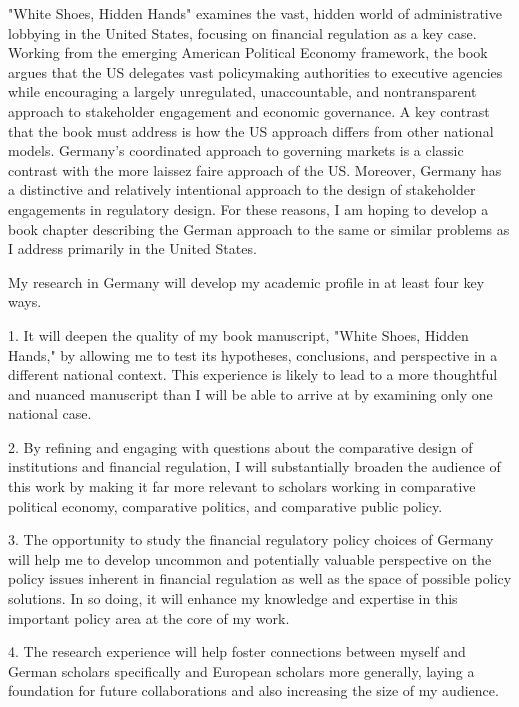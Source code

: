 "White Shoes, Hidden Hands" examines the vast, hidden world of administrative lobbying in the United States, focusing on financial regulation as a key case. Working from the emerging American Political Economy framework, the book argues that the US delegates vast policymaking authorities to executive agencies while encouraging a largely unregulated, unaccountable, and nontransparent approach to stakeholder engagement and economic governance. A key contrast that the book must address is how the US approach differs from other national models. Germany's coordinated approach to governing markets is a classic contrast with the more laissez faire approach of the US. Moreover, Germany has a distinctive and relatively intentional approach to the design of stakeholder engagements in regulatory design. For these reasons, I am hoping to develop a book chapter describing the German approach to the same or similar problems as I address primarily in the United States. 



My research in Germany will develop my academic profile in at least four key ways.

1. It will deepen the quality of my book manuscript, "White Shoes, Hidden Hands," by allowing me to test its hypotheses, conclusions, and perspective in a different national context. This experience is likely to lead to a more thoughtful and nuanced manuscript than I will be able to arrive at by examining only one national case.

2. By refining and engaging with questions about the comparative design of institutions and financial regulation, I will substantially broaden the audience of this work by making it far more relevant to scholars working in comparative political economy, comparative politics, and comparative public policy. 

3. The opportunity to study the financial regulatory policy choices of Germany will help me to develop uncommon and potentially valuable perspective on the policy issues inherent in financial regulation as well as the space of possible policy solutions. In so doing, it will enhance my knowledge and expertise in this important policy area at the core of my work.

4. The research experience will help foster connections between myself and German scholars specifically and European scholars more generally, laying a foundation for future collaborations and also increasing the size of my audience.

